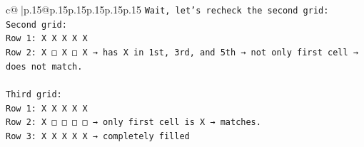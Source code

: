 \documentclass{article}
\begin{document}
{\begin{supertabular}{c@{$\;$}|p{.15\linewidth}@{}p{.15\linewidth}p{.15\linewidth}p{.15\linewidth}p{.15\linewidth}p{.15\linewidth}}
{{{\texttt{Wait, let's recheck the second grid:} \\
\texttt{Second grid:} \\
\texttt{Row 1: X X X X X} \\
\texttt{Row 2: X □ X □ X → has X in 1st, 3rd, and 5th → not only first cell → does not match.} \\
\\ 
\texttt{Third grid:} \\
\texttt{Row 1: X X X X X} \\
\texttt{Row 2: X □ □ □ □ → only first cell is X → matches.} \\
\texttt{Row 3: X X X X X → completely filled} \\
            }
        }
    }
     \\ \\


\end{supertabular}}
\end{document}
